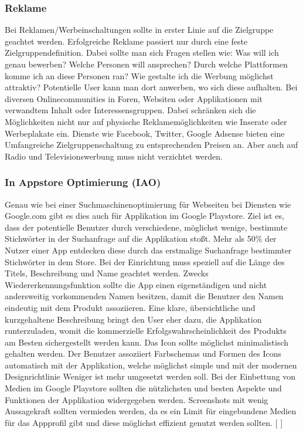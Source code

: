 \documentclass[FIPLY_base.tex]{subfiles}
\begin{document}
\subsubsection{Reklame}
Bei Reklamen/Werbeinschaltungen sollte in erster Linie auf die Zielgruppe geachtet werden. Erfolgreiche Reklame passiert nur durch eine feste Zielgruppendefinition. Dabei sollte man sich Fragen stellen wie: Was will ich genau bewerben? Welche Personen will ansprechen? Durch welche Plattformen komme ich an diese Personen ran? Wie gestalte ich die Werbung möglichst attraktiv? \newline
Potentielle User kann man dort anwerben, wo sich diese aufhalten. Bei diversen Onlinecommunities in Foren, Websiten oder Applikationen mit verwandtem Inhalt oder Interessensgruppen. Dabei schränken sich die Möglichkeiten nicht nur auf physische Reklamemöglichkeiten wie Inserate oder Werbeplakate ein. Dienste wie Facebook, Twitter, Google Adsense bieten eine Umfangreiche Zielgruppenschaltung zu entsprechenden Preisen an. Aber auch auf Radio und Televisionswerbung muss nicht verzichtet werden.


\subsubsection{In Appstore Optimierung (IAO)}
Genau wie bei einer Suchmaschinenoptimierung für Webseiten bei Diensten wie Google.com gibt es dies auch für Applikation im Google Playstore. Ziel ist es, dass der potentielle Benutzer durch verschiedene, möglichst wenige, bestimmte Stichwörter in der Suchanfrage auf die Applikation stoßt. Mehr als 50\% der Nutzer einer App entdecken diese durch das erstmalige Suchanfrage bestimmter Stichwörter in dem Store.
\newline
Bei der Einrichtung muss speziell auf die Länge des Titels, Beschreibung und Name geachtet werden. Zwecks Wiedererkennungsfunktion sollte die App einen eigenständigen und nicht andersweitig vorkommenden Namen besitzen, damit die Benutzer den Namen eindeutig mit dem Produkt assoziieren. Eine klare, übersichtliche und kurzgehaltene Beschreibung bringt den User eher dazu, die Applikation runterzuladen, womit die kommerzielle Erfolgswahrscheinlichkeit des Produkts am Besten sichergestellt werden kann. 
\newline
Das Icon sollte möglichst minimalistisch gehalten werden. Der Benutzer assoziiert Farbschemas und Formen des Icons automatisch mit der Applikation, welche möglichst simple und mit der modernen Designrichtlinie \grqq{}Weniger ist mehr\grqq{} umgesetzt werden soll. 
\newline
Bei der Einbettung von Medien im Google Playstore sollten die nützlichsten und besten Aspekte und Funktionen der Applikation widergegeben werden. Screenshots mit wenig Aussagekraft sollten vermieden werden, da es ein Limit für eingebundene Medien für das Appprofil gibt und diese möglichst effizient genutzt werden sollten.
[ \cite{promteil2}]
\end{document}
